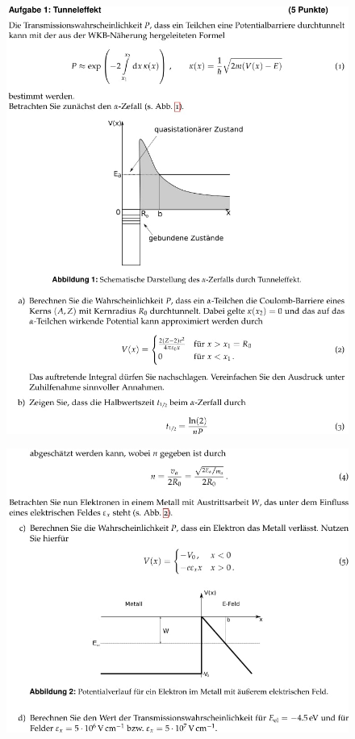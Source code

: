    \begin{figure}[H]
        \centering
        \includegraphics[width=\textwidth]{images/Aufgabe1a.jpg}
        \label{fig:1}
    \end{figure}
        \begin{figure}[H]
        \centering
        \includegraphics[width=\textwidth]{images/Aufgabe1bcd.jpg}
        \label{fig:2}
    \end{figure}

